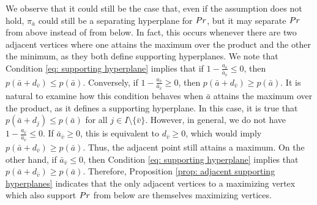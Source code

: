 \documentclass{article}
\begin{document}
We observe that it could still be the case that, even if the assumption does not hold, \(\pi_{\bar{a}}\) could still be a separating hyperplane for \(Pr\), but it may separate \(Pr\) from above instead of from below. In fact, this occurs whenever there are two adjacent vertices where one attains the maximum over the product and the other the minimum, as they both define supporting hyperplanes.
%
We note that Condition \eqref{eq: supporting hyperplane} implies that if \(1 - \frac{a_{\bar{v}}}{\bar{a}_{\bar{v}}} \leq 0\), then \(p(\bar{a} + d_{\bar{v}}) \leq p(\bar{a})\). Conversely, if \(1 - \frac{a_{\bar{v}}}{\bar{a}_{\bar{v}}} \geq 0\), then \(p(\bar{a} + d_{\bar{v}}) \geq p(\bar{a})\).
%
It is natural to examine how this condition behaves when \(\bar{a}\) attains the maximum over the product, as it defines a supporting hyperplane. In this case, it is true that \(p(\bar{a} + d_j) \leq p(\bar{a})\) for all \(j \in I \setminus \{\bar{v}\}\). However, in general, we do not have \(1 - \frac{a_{\bar{v}}}{\bar{a}_{\bar{v}}} \leq 0\). If \(\bar{a}_{\bar{v}} \geq 0\), this is equivalent to \(d_{\bar{v}} \geq 0\), which would imply \(p(\bar{a} + d_{\bar{v}}) \geq p(\bar{a})\). Thus, the adjacent point still attains a maximum.
%
On the other hand, if \(\bar{a}_{\bar{v}} \leq 0\), then Condition \eqref{eq: supporting hyperplane} implies that \(p(\bar{a} + d_{\bar{v}}) \geq p(\bar{a})\). Therefore, Proposition \ref{prop: adjacent supporting hyperplanes} indicates that the only adjacent vertices to a maximizing vertex which also support \(Pr\) from below are themselves maximizing vertices.
%
\end{document}
